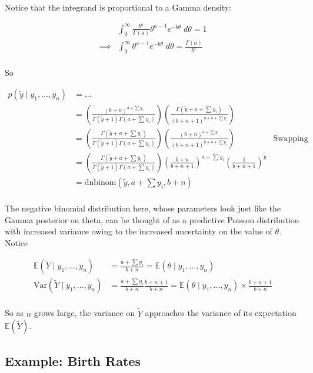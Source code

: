 \documentclass[]{article}
\begin{document}
Notice that the integrand is proportional to a Gamma density:

\begin{align}
& \int_0^{\infty} \frac{b^a}{\Gamma(a)} \theta^{a - 1} e^{-b \theta} \; d\theta = 1\\
\implies& \int_0^{\infty} \theta^{a - 1} e^{-b\theta} \; d\theta = \frac{\Gamma(a)}{b^a} \\
\end{align}

So

\begin{align}
p(\tilde{y} \mid y_1, \dots, y_n) &= \dots \\
&= \left( \frac{(b + n)^{a + \sum y_i}}{\Gamma(\tilde{y} + 1) \Gamma(a + \sum y_i)} \right) \left( \frac{\Gamma(\tilde{y} + a + \sum y_i)}{(b + n + 1)^{\tilde{y} + a + \sum y_i}} \right) \\
&= \left( \frac{\Gamma(\tilde{y} + a + \sum y_i)}{\Gamma(\tilde{y} + 1) \Gamma(a + \sum y_i)} \right) \left( \frac{(b + n)^{a + \sum y_i}}{(b + n + 1)^{\tilde{y} + a + \sum y_i}} \right) & \text{Swapping numerators} \\
&= \left( \frac{\Gamma(\tilde{y} + a + \sum y_i)}{\Gamma(\tilde{y} + 1) \Gamma(a + \sum y_i)} \right) \left( \frac{b + n}{b + n + 1} \right)^{a + \sum y_i} \left( \frac{1}{b + n + 1} \right)^{\tilde{y}} \\
&= \text{dnbinom}(\tilde{y}, a + \sum y_i, b + n) \\
\end{align}

The negative binomial distribution here, whose parameters look just like
the Gamma posterior on theta, can be thought of as a predictive Poisson
distribution with increased variance owing to the increased uncertainty
on the value of \(\theta\). Notice

\begin{align}
\mathbb{E}(\tilde{Y} \mid y_1, \dots, y_n) &= \frac{a + \sum y_i}{b + n} = \mathbb{E}(\theta \mid y_1, \dots, y_n) \\
\text{Var}(\tilde{Y} \mid y_1, \dots, y_n) &= \frac{a + \sum y_i}{b + n} \frac{b
+ n + 1}{b + n} = \mathbb{E}(\theta \mid y_1, \dots, y_n) \times \frac{b + n + 1}{b + n}
\\
\end{align}

So as \(n\) grows large, the variance on \(\tilde{Y}\) approaches the
variance of its expectation \(\mathbb{E}(\tilde{Y})\).

\hypertarget{example-birth-rates}{%
\subsection{Example: Birth Rates}\label{example-birth-rates}}
\end{document}
